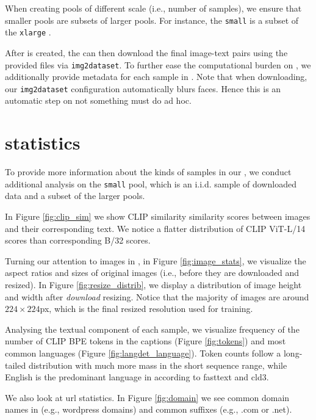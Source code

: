 When creating pools of different scale (i.e., number of samples), we ensure that smaller pools are subsets of larger pools. For instance, the {\small \texttt{small}} \pool is a subset of the {\small \texttt{xlarge}} \pool.

After \pool is created, the \users can then download the final image-text pairs using the provided files via \texttt{img2dataset}. To further ease the computational burden on \users, we additionally provide metadata for each sample in \pool. Note that when downloading, our \texttt{img2dataset} configuration automatically blurs faces. Hence this is an automatic step on not something \users must do ad hoc.

\section{\pool statistics}
\label{app:pool-stats} 

To provide more information about the kinds of samples in our \pool, we conduct additional analysis on the {\small \texttt{small}} pool, which is an i.i.d. sample of downloaded data and a subset of the larger pools.

In Figure \ref{fig:clip_sim} we show CLIP similarity similarity scores between images and their corresponding text. We notice a flatter distribution of CLIP ViT-L/14 scores than corresponding B/32 scores.

Turning our attention to images in \pool, in Figure \ref{fig:image_stats}, we visualize the aspect ratios and sizes of original images (i.e., before they are downloaded and resized).
In Figure \ref{fig:resize_distrib}, we display a distribution of image height and width after \emph{download} resizing. Notice that the majority of images are around $224 \times 224$px, which is the final resized resolution used for training.

Analysing the textual component of each sample, we visualize frequency of the number of CLIP BPE tokens in the captions (Figure \ref{fig:tokens}) and most common languages (Figure \ref{fig:langdet_language}).
Token counts follow a long-tailed distribution with much more mass in the short sequence range, while English is the predominant language in \pool according to fasttext and cld3.

We also look at url statistics. In Figure \ref{fig:domain} we see common domain names in \pool (e.g., wordpress domains) and common suffixes (e.g., .com or .net).

